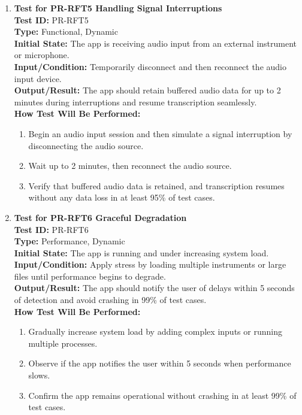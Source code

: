 \documentclass[12pt, titlepage]{article}
\begin{document}
\begin{enumerate}
    \item \textbf{Test for PR-RFT5 Handling Signal Interruptions} \\
      \newline
      \textbf{Test ID:} PR-RFT5 \\
      \textbf{Type:} Functional, Dynamic \\
      \textbf{Initial State:} The app is receiving audio input from an external instrument or microphone. \\
      \textbf{Input/Condition:} Temporarily disconnect and then reconnect the audio input device. \\
      \textbf{Output/Result:} The app should retain buffered audio data for up to 2 minutes during interruptions and resume transcription seamlessly. \\
      \textbf{How Test Will Be Performed:}
      \begin{enumerate}
          \item Begin an audio input session and then simulate a signal interruption by disconnecting the audio source.
          \item Wait up to 2 minutes, then reconnect the audio source.
          \item Verify that buffered audio data is retained, and transcription resumes without any data loss in at least 95\% of test cases.
      \end{enumerate}

    \item \textbf{Test for PR-RFT6 Graceful Degradation} \\
      \newline
      \textbf{Test ID:} PR-RFT6 \\
      \textbf{Type:} Performance, Dynamic \\
      \textbf{Initial State:} The app is running and under increasing system load. \\
      \textbf{Input/Condition:} Apply stress by loading multiple instruments or large files until performance begins to degrade. \\
      \textbf{Output/Result:} The app should notify the user of delays within 5 seconds of detection and avoid crashing in 99\% of test cases. \\
      \textbf{How Test Will Be Performed:}
      \begin{enumerate}
          \item Gradually increase system load by adding complex inputs or running multiple processes.
          \item Observe if the app notifies the user within 5 seconds when performance slows.
          \item Confirm the app remains operational without crashing in at least 99\% of test cases.
      \end{enumerate}


\end{enumerate}
\end{document}
